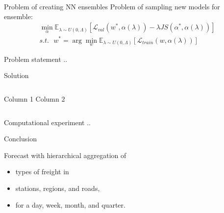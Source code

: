 \documentclass{beamer}
\begin{document}
\begin{frame}{Problem of creating NN ensembles}
\bigskip
Problem of sampling new models for ensemble: 
\begin{gather*}
    \min_{\alpha} \mathbb{E}_{\lambda \sim U(0, \Lambda)} [\mathcal{L}_{val}(w^*, \alpha(\lambda)) - \lambda JS(\alpha^*, \alpha(\lambda))] \\
    s.t. \text{ } w^* = \arg \min_w \mathbb{E}_{\lambda \sim U(0, \Lambda)}[\mathcal{L}_{train}(w, \alpha(\lambda))]
\end{gather*}

\end{frame}


\begin{frame}{Problem statement}
..
\end{frame}
\begin{frame}{Solution}
\begin{columns}[c]
    Column 1
    Column 2
\end{columns}
\end{frame}
\begin{frame}{Computational experiment}
..
\end{frame}
\begin{frame}{Conclusion}
    \begin{block}{Forecast with hierarchical aggregation of}
    \begin{itemize}
        \item types of freight in
        \item stations, regions, and roads,
        \item for a day, week, month, and quarter.
    \end{itemize}
    \end{block}
\end{frame}
\end{document}
